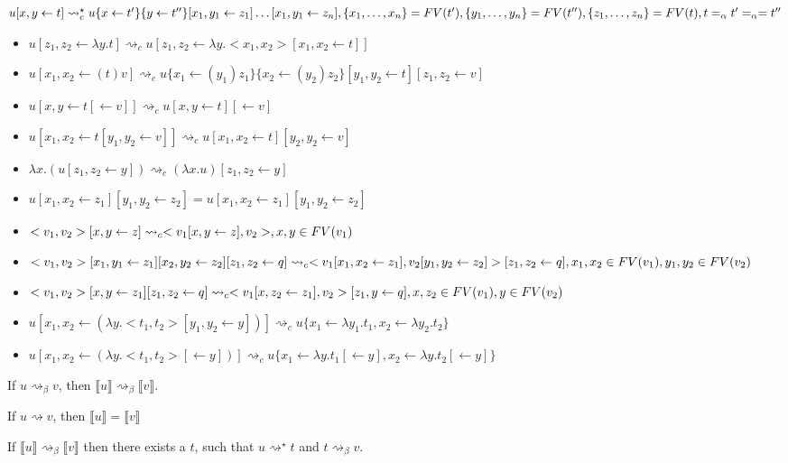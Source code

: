 \documentclass[a4paper]{article}
\begin{document}
$u[x,y\leftarrow t] \rightsquigarrow_c^\star u\{x\leftarrow t'\}\{y\leftarrow t''\}[x_1,y_1\leftarrow z_1]\dots[x_1,y_1\leftarrow z_n], \{x_1,\dots,x_n\}=\mathop{FV}(t'), \{y_1,\dots,y_n\}=\mathop{FV}(t''), \{z_1,\dots,z_n\}=\mathop{FV}(t), t=_\alpha t'=_\alpha =t''$
\begin{itemize}
 \item $u[z_1,z_2\leftarrow \lambda y.t] \rightsquigarrow_c u[z_1,z_2\leftarrow \lambda y.<x_1,x_2>[x_1,x_2\leftarrow t]]$
 \item $u[x_1,x_2\leftarrow (t)v] \rightsquigarrow_c u\{x_1\leftarrow (y_1)z_1\}\{x_2\leftarrow (y_2)z_2\}[y_1,y_2\leftarrow t][z_1,z_2\leftarrow v]$
 \item $u[x,y\leftarrow t[\leftarrow v]] \rightsquigarrow_c u[x,y\leftarrow t][\leftarrow v]$
 \item $u[x_1,x_2\leftarrow t[y_1,y_2\leftarrow v]] \rightsquigarrow_c u[x_1,x_2\leftarrow t][y_2,y_2\leftarrow v]$
 \item $\lambda x.(u[z_1,z_2\leftarrow y]) \rightsquigarrow_c (\lambda x.u)[z_1,z_2\leftarrow y]$
 \item $u[x_1,x_2\leftarrow z_1][y_1,y_2\leftarrow z_2]=u[x_1,x_2\leftarrow z_1][y_1,y_2\leftarrow z_2]$
 \item $<v_1,v_2>[x,y\leftarrow z] \rightsquigarrow_c <v_1[x,y\leftarrow z],v_2>, x,y\in\mathop{FV}(v_1)$
 \item $<v_1,v_2>[x_1,y_1\leftarrow z_1][x_2,y_2\leftarrow z_2][z_1,z_2\leftarrow q] \rightsquigarrow_c <v_1[x_1,x_2\leftarrow z_1],v_2[y_1,y_2\leftarrow z_2]>[z_1,z_2\leftarrow q], x_1,x_2\in\mathop{FV}(v_1), y_1,y_2\in\mathop{FV}(v_2)$
 \item $<v_1,v_2>[x,y\leftarrow z_1][z_1,z_2\leftarrow q] \rightsquigarrow_c <v_1[x,z_2\leftarrow z_1],v_2>[z_1,y\leftarrow q], x,z_2\in\mathop{FV}(v_1), y\in\mathop{FV}(v_2)$
 \item $u[x_1,x_2\leftarrow (\lambda y.<t_1,t_2>[y_1,y_2\leftarrow y])] \rightsquigarrow_c u\{x_1\leftarrow \lambda y_1.t_1, x_2\leftarrow \lambda y_2.t_2\}$
 \item $u[x_1,x_2\leftarrow (\lambda y.<t_1,t_2>[\leftarrow y])] \rightsquigarrow_c u\{x_1\leftarrow \lambda y.t_1[\leftarrow y], x_2\leftarrow \lambda y.t_2[\leftarrow y]\}$
\end{itemize}

 If $u\rightsquigarrow_\beta v$, then $\llbracket u\rrbracket \rightsquigarrow_\beta \llbracket v\rrbracket$.

 If $u\rightsquigarrow v$, then $\llbracket u\rrbracket = \llbracket v\rrbracket$

 If $\llbracket u\rrbracket \rightsquigarrow_\beta \llbracket v\rrbracket$ then there exists a $t$, such that $u\rightsquigarrow^\star t$ and $t\rightsquigarrow_\beta v$.
\end{document}
